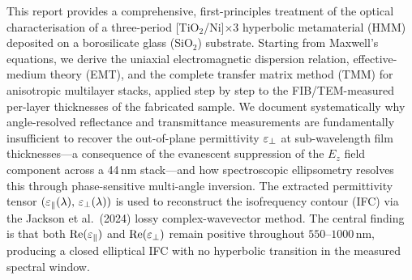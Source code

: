 \noindent
This report provides a comprehensive, first-principles treatment of the optical
characterisation of a three-period [TiO$_2$/Ni]$\times$3 hyperbolic metamaterial
(HMM) deposited on a borosilicate glass (SiO$_2$) substrate. Starting from
Maxwell's equations, we derive the uniaxial electromagnetic dispersion relation,
effective-medium theory (EMT), and the complete transfer matrix method (TMM) for
anisotropic multilayer stacks, applied step by step to the FIB/TEM-measured
per-layer thicknesses of the fabricated sample. We document systematically why
angle-resolved reflectance and transmittance measurements are fundamentally
insufficient to recover the out-of-plane permittivity $\varepsilon_{\perp}$ at sub-wavelength
film thicknesses---a consequence of the evanescent suppression of the $E_z$ field
component across a \mbox{44\,nm} stack---and how spectroscopic ellipsometry resolves
this through phase-sensitive multi-angle inversion. The extracted permittivity
tensor $(\varepsilon_{\parallel}(\lambda),\,\varepsilon_{\perp}(\lambda))$ is used to reconstruct the
isofrequency contour (IFC) via the Jackson et al.\ (2024) lossy complex-wavevector
method. The central finding is that both $\operatorname{Re}(\varepsilon_{\parallel})$ and $\operatorname{Re}(\varepsilon_{\perp})$ remain
positive throughout $550$--$1000$\,nm, producing a closed elliptical IFC with no
hyperbolic transition in the measured spectral window.
